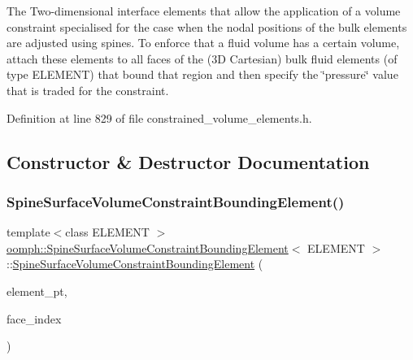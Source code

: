 The Two-\/dimensional interface elements that allow the application of a volume constraint specialised for the case when the nodal positions of the bulk elements are adjusted using spines. To enforce that a fluid volume has a certain volume, attach these elements to all faces of the (3D Cartesian) bulk fluid elements (of type E\+L\+E\+M\+E\+NT) that bound that region and then specify the \char`\"{}pressure\char`\"{} value that is traded for the constraint. 

Definition at line 829 of file constrained\+\_\+volume\+\_\+elements.\+h.



\subsection{Constructor \& Destructor Documentation}
\mbox{\label{classoomph_1_1SpineSurfaceVolumeConstraintBoundingElement_a1426f4750d43008e7c33526cf01f23f3}} 
\subsubsection{\texorpdfstring{Spine\+Surface\+Volume\+Constraint\+Bounding\+Element()}{SpineSurfaceVolumeConstraintBoundingElement()}}
{\footnotesize\ttfamily template$<$class E\+L\+E\+M\+E\+NT $>$ \\
\hyperlink{classoomph_1_1SpineSurfaceVolumeConstraintBoundingElement}{oomph\+::\+Spine\+Surface\+Volume\+Constraint\+Bounding\+Element}$<$ E\+L\+E\+M\+E\+NT $>$\+::\hyperlink{classoomph_1_1SpineSurfaceVolumeConstraintBoundingElement}{Spine\+Surface\+Volume\+Constraint\+Bounding\+Element} (\begin{DoxyParamCaption}\item[{\hyperlink{classoomph_1_1FiniteElement}{Finite\+Element} $\ast$const \&}]{element\+\_\+pt,  }\item[{const int \&}]{face\+\_\+index }\end{DoxyParamCaption})\hspace{0.3cm}{\ttfamily [inline]}}



